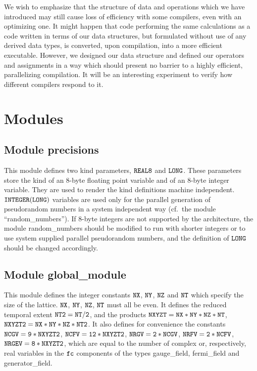 We wish to emphasize that the structure of
data and operations which we have introduced may still cause loss
of efficiency with some compilers, even with an optimizing one.
It might happen that code performing the same calculations as a
code written in terms of our data structures, but formulated without
use of any derived data types, is converted, upon compilation, into a more
efficient executable.  However, we designed our data structure
and defined our operators and assignments in a way which should present
no barrier to a highly efficient, parallelizing compilation.  It will
be an interesting experiment to verify how different compilers respond
to it.

\section{Modules}
\label{modules}

\subsection{Module precisions}
\label{precisions}

This module defines two kind parameters, $\tt REAL8 $ and $\tt LONG $.
These parameters store the kind of an 8-byte floating point variable
and of an 8-byte integer variable.  They are used to render the 
kind definitions machine independent.  $\tt INTEGER(LONG) $ variables
are used only for the parallel generation of pseudorandom numbers 
in a system independent way (cf.~the module ``random\_numbers'').  
If 8-byte integers are not supported by the architecture, the module 
random\_numbers should be modified to run with shorter integers
or to use system supplied parallel pseudorandom numbers, and the 
definition of $\tt LONG$ should be changed accordingly.

\subsection{Module global\_module}
\label{global}

This module defines the integer constants $\tt NX$, $\tt NY$, $\tt NZ$
and $\tt NT$ which specify the size of the lattice. $\tt NX$, $\tt NY$, 
$\tt NZ$, $\tt NT$ must all be even.  It defines the reduced
temporal extent $\tt NT2= NT/2$, and the products 
$\tt NXYZT = NX*NY*NZ*NT$, $\tt NXYZT2 = NX*NY*NZ*NT2$. 
It also defines for convenience the constants
$\tt NCGV = 9*NXYZT2$, $\tt NCFV = 12*NXYZT2$, 
$\tt NRGV= 2*NCGV$, $\tt NRFV= 2*NCFV$, $\tt NRGEV= 8*NXYZT2$,
which are equal to the number of complex or, respectively, real variables
in the $\tt fc$ components of the types gauge\_field, fermi\_field 
and generator\_field. 

